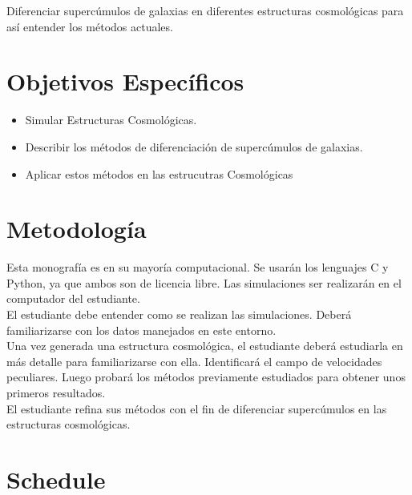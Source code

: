 \documentclass[12pt]{article}
\begin{document}
Diferenciar superc\'{u}mulos de galaxias en diferentes estructuras cosmol\'{o}gicas para as\'{i} entender los m\'{e}todos actuales.
\\

\section{Objetivos Espec\'{i}ficos}

\begin{itemize}
	\item Simular Estructuras Cosmol\'{o}gicas.
	\item Describir los m\'{e}todos de diferenciaci\'{o}n de superc\'{u}mulos de galaxias.
	\item Aplicar estos m\'{e}todos en las estrucutras Cosmol\'{o}gicas
\end{itemize}

\section{Metodolog\'{i}a}

Esta monograf\'{i}a es en su mayor\'{i}a computacional. Se usar\'{a}n los lenguajes C y Python, ya que ambos son de licencia libre. Las simulaciones ser realizar\'{a}n en el computador del estudiante.  
\\

El estudiante debe entender como se realizan las simulaciones. Deber\'{a} familiarizarse con los datos manejados en este entorno. 
\\

Una vez generada una estructura cosmol\'{o}gica, el estudiante deber\'{a} estudiarla en m\'{a}s detalle para familiarizarse con ella. Identificar\'{a} el campo de velocidades peculiares. Luego probar\'{a} los m\'{e}todos previamente estudiados para obtener unos primeros resultados.
\\

El estudiante refina sus m\'{e}todos con el fin de diferenciar superc\'{u}mulos en las estructuras cosmol\'{o}gicas.
\\

\section{Schedule}
\end{document}
